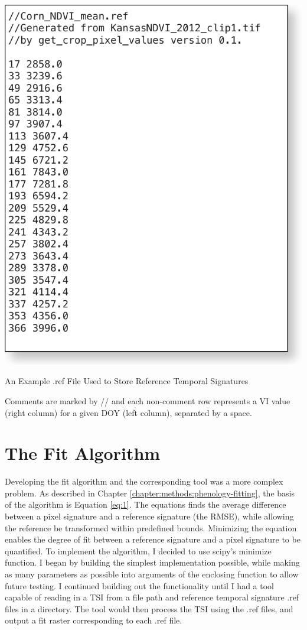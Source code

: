 \begin{ssfigure}
  \centering
  \includegraphics[scale=0.75]{Graphics/reffile.pdf}
  \caption{An Example .ref File Used to Store Reference Temporal Signatures}
  \medskip
  \small
  Comments are marked by // and each non-comment row represents a VI value (right column) for a given DOY (left column), separated by a space.
  \label{fig:reffile}
\end{ssfigure}



\section{The Fit Algorithm}
\label{appendix:tools:fit}

Developing the fit algorithm and the corresponding tool was a more complex problem. As described in Chapter \ref{chapter:methods:phenology-fitting}, the basis of the algorithm is Equation \ref{eq:1}. The equations finds the average difference between a pixel signature and a reference signature (the RMSE), while allowing the reference be transformed within predefined bounds. Minimizing the equation enables the degree of fit between a reference signature and a pixel signature to be quantified. To implement the algorithm, I decided to use scipy’s minimize function. I began by building the simplest implementation possible, while making as many parameters as possible into arguments of the enclosing function to allow future testing. I continued building out the functionality until I had a tool capable of reading in a TSI from a file path and reference temporal signature .ref files in a directory. The tool would then process the TSI using the .ref files, and output a fit raster corresponding to each .ref file.

